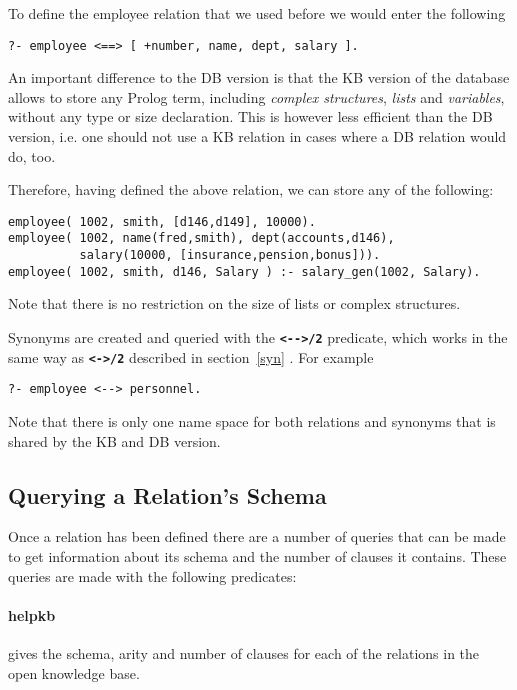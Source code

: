 To define the employee relation that we used before we would enter
the following

\begin{verbatim}
?- employee <==> [ +number, name, dept, salary ].
\end{verbatim}



An important difference to the DB version is that the KB version of the 
database allows to store any Prolog term, including 
{\em complex structures}, {\em lists} and {\em variables},
without any type or size declaration. This is however less efficient
than the DB version, i.e. one should not use a KB relation in cases
where a DB relation would do, too.

Therefore, having defined the above relation, we can store any of the following:

\begin{verbatim}
employee( 1002, smith, [d146,d149], 10000).
employee( 1002, name(fred,smith), dept(accounts,d146), 
          salary(10000, [insurance,pension,bonus])).
employee( 1002, smith, d146, Salary ) :- salary_gen(1002, Salary).
\end{verbatim}

 
Note that there is no restriction on the size of lists or complex structures.


Synonyms are created and queried with the {\bf \verb+<-->/2+} predicate, 
which works in the same way as  
{\bf \verb+<->/2+ } described in section~\ref{syn} .  For example
 
\begin{verbatim}
?- employee <--> personnel.
\end{verbatim}

Note that there is only one name space for both relations and synonyms
that is shared by the KB and DB version.

\subsection{Querying a Relation's Schema}

Once a relation has been defined there are a number
of queries that can be made to get information
about its schema and the number of clauses it contains.
These queries are made with the following
predicates:

\paragraph{ helpkb } gives the schema, arity and number of clauses
for each of the relations in the open knowledge base.

